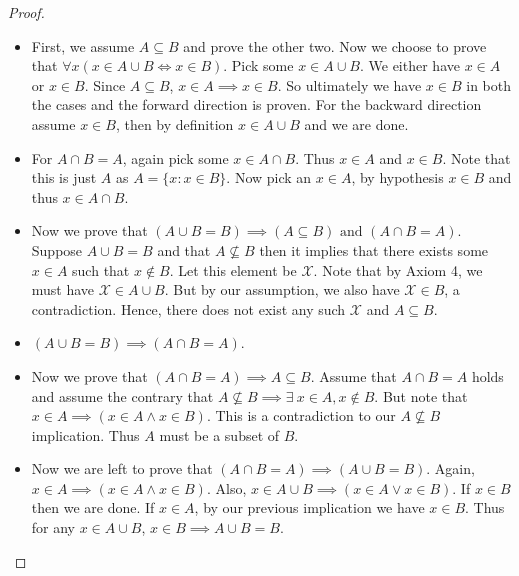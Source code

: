 \documentclass[12pt]{article}
\theoremstyle{remark}
\begin{document}
\begin{proof} 
	~\begin{itemize}
   		\item First, we assume $ A \subseteq B $ and prove the other two. Now we choose to prove that $ \forall x (x \in A \cup B \iff x \in B) $. Pick some $ x \in A \cup B $. We either have $ x \in A $ or $ x \in B $. Since $ A \subseteq B $, $ x \in A \implies x \in B $. So ultimately we have $ x \in B $ in both the cases and the forward direction is proven. For the backward direction assume $ x \in B $, then by definition $ x \in A \cup B $ and we are done. 

   		\item For $ A \cap B = A $, again pick some $ x \in A \cap B $. Thus $ x \in A $ and $ x \in B $. Note that this is just $ A $ as $ A = \{ x : x \in B \} $. Now pick an $ x \in A $, by hypothesis $ x \in B $ and thus $ x \in A \cap B $. 

   		\item Now we prove that $ (A \cup B = B) \implies (A \subseteq B) \text{ and } (A \cap B = A) $. Suppose $ A \cup B = B $ and that $ A \nsubseteq B $ then it implies that there exists some $ x \in A $ such that $ x \notin B $. Let this element be $ \mathcal{X} $. Note that by Axiom 4, we must have $ \mathcal{X} \in A \cup B $. But by our assumption, we also have $ \mathcal{X} \in B $, a contradiction. Hence, there does not exist any such $ \mathcal{X} $ and $ A \subseteq B $.
		\item $ (A \cup B = B) \implies (A \cap B = A) $.

		\item Now we prove that $ (A \cap B = A) \implies A \subseteq B $. Assume that $ A \cap B = A $ holds and assume the contrary that $ A \nsubseteq B \implies \exists \ x \in A, x \notin B $. But note that $ x \in A \implies (x \in A \land x \in B) $. This is a contradiction to our $ A \nsubseteq B $ implication. Thus $ A $ must be a subset of $ B $.

		\item Now we are left to prove that $ (A \cap B = A) \implies (A \cup B = B) $. Again, $ x \in A \implies (x \in A \land x \in B) $. Also, $ x \in A \cup B \implies (x \in A \lor x \in B) $. If $ x \in B $ then we are done. If $ x \in A $, by our previous implication we have $ x \in B $. Thus for any $ x \in A \cup B $, $ x \in B \implies A \cup B = B $.  
	\end{itemize}


\end{proof}
\end{document}
